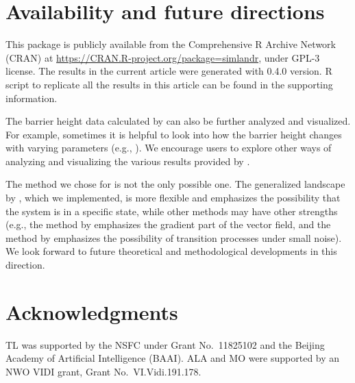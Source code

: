 \section{Availability and future directions}\label{availability-and-future-directions}

This package is publicly available from the Comprehensive R Archive Network (CRAN) at \url{https://CRAN.R-project.org/package=simlandr}, under GPL-3 license. The results in the current article were generated with  0.4.0 version. R script to replicate all the results in this article can be found in the supporting information.

The barrier height data calculated by  can also be further analyzed and visualized. For example, sometimes it is helpful to look into how the barrier height changes with varying parameters (e.g., \citet{CuiEtAlMetaphorComputationConstructing2021}). We encourage users to explore other ways of analyzing and visualizing the various results provided by .

The method we chose for  is not the only possible one. The generalized landscape by \citet{wangPotentialLandscapeFlux2008}, which we implemented, is more flexible and emphasizes the possibility that the system is in a specific state, while other methods may have other strengths (e.g., the method by \citet{rodriguez-sanchezPabRodRolldownPostpublication2020} emphasizes the gradient part of the vector field, and the method by \citet{MooreEtAlQPotPackageStochastic2016} emphasizes the possibility of transition processes under small noise). We look forward to future theoretical and methodological developments in this direction.

\section{Acknowledgments}\label{acknowledgments}

TL was supported by the NSFC under Grant No.~11825102 and the Beijing Academy of Artificial Intelligence (BAAI). ALA and MO were supported by an NWO VIDI grant, Grant No.~VI.Vidi.191.178.



\address{%
Jingmeng Cui\\
University of Groningen,Radboud University\\%
Faculty of Behavioural and Social Sciences, Groningen, the Netherlands\\ Behavioural Science Institute, Nijmegen, the Netherlands\\
%
%
\textit{ORCiD: \href{https://orcid.org/0000-0003-3421-8457}{0000-0003-3421-8457}}\\%
\href{mailto:jingmeng.cui@rug.nl}{\nolinkurl{jingmeng.cui@rug.nl}}%
}

